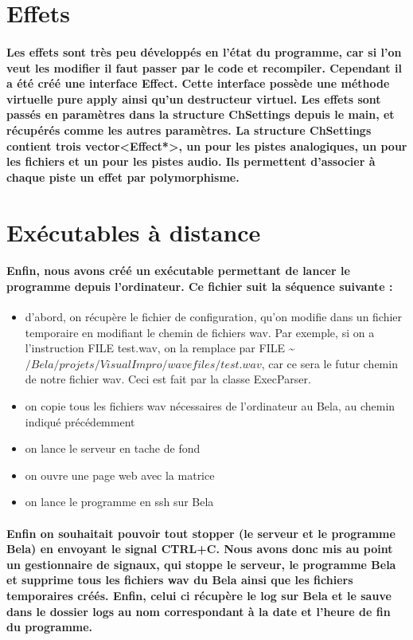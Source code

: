 \documentclass[a4paper]{article}
\begin{document}
\section{Effets} \paragraph{Les effets sont très peu développés en l’état du
programme, car si l’on veut les modifier il faut passer par le code et
recompiler. Cependant il a été créé une interface Effect. Cette interface
possède une méthode virtuelle pure apply ainsi qu’un destructeur virtuel. Les
effets sont passés en paramètres dans la structure ChSettings depuis le main, et
récupérés comme les autres paramètres. La structure ChSettings contient trois
vector<Effect*>, un pour les pistes analogiques, un pour les fichiers et un pour
les pistes audio. Ils permettent d’associer à chaque piste un effet par
polymorphisme.}

\section{Exécutables à distance} \paragraph{Enfin, nous avons créé un exécutable
permettant de lancer le programme depuis l’ordinateur. Ce fichier suit la
séquence suivante :}

\begin{itemize} \item d’abord, on récupère le fichier de configuration, qu’on
modifie dans un fichier temporaire en modifiant le chemin de fichiers wav. Par
exemple, si on a l’instruction FILE test.wav, on la remplace par FILE
\textasciitilde $/Bela/projets/VisualImpro/wavefiles/test.wav$, car ce sera le
futur chemin de notre fichier wav. Ceci est fait par la classe ExecParser. \item
on copie tous les fichiers wav nécessaires de l’ordinateur au Bela, au chemin
indiqué précédemment \item on lance le serveur en tache de fond \item on ouvre
une page web avec la matrice \item on lance le programme en ssh sur Bela
\end{itemize}

\paragraph{Enfin on souhaitait pouvoir tout stopper (le serveur et le programme
Bela) en envoyant le signal CTRL+C. Nous avons donc mis au point un gestionnaire
de signaux, qui stoppe le serveur, le programme Bela et supprime tous les
fichiers wav du Bela ainsi que les fichiers temporaires créés. Enfin, celui ci
récupère le log sur Bela et le sauve dans le dossier logs au nom correspondant à
la date et l’heure de fin du programme.}
\end{document}
